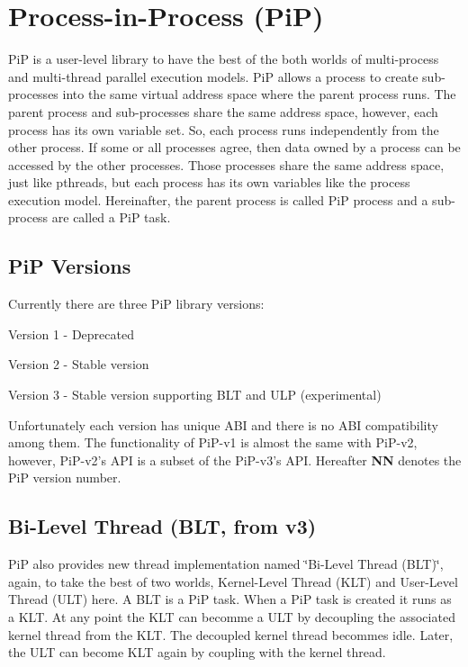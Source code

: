\section*{Process-\/in-\/\-Process (Pi\-P)}

Pi\-P is a user-\/level library to have the best of the both worlds of multi-\/process and multi-\/thread parallel execution models. Pi\-P allows a process to create sub-\/processes into the same virtual address space where the parent process runs. The parent process and sub-\/processes share the same address space, however, each process has its own variable set. So, each process runs independently from the other process. If some or all processes agree, then data owned by a process can be accessed by the other processes. Those processes share the same address space, just like pthreads, but each process has its own variables like the process execution model. Hereinafter, the parent process is called Pi\-P process and a sub-\/process are called a Pi\-P task.

\subsection*{Pi\-P Versions}

Currently there are three Pi\-P library versions\-:


\begin{DoxyItemize}
\item Version 1 -\/ Deprecated
\item Version 2 -\/ Stable version
\item Version 3 -\/ Stable version supporting B\-L\-T and U\-L\-P (experimental)
\end{DoxyItemize}

Unfortunately each version has unique A\-B\-I and there is no A\-B\-I compatibility among them. The functionality of Pi\-P-\/v1 is almost the same with Pi\-P-\/v2, however, Pi\-P-\/v2's A\-P\-I is a subset of the Pi\-P-\/v3's A\-P\-I. Hereafter {\bfseries N\-N} denotes the Pi\-P version number.

\subsection*{Bi-\/\-Level Thread (B\-L\-T, from v3)}

Pi\-P also provides new thread implementation named \char`\"{}\-Bi-\/\-Level Thread
(\-B\-L\-T)\char`\"{}, again, to take the best of two worlds, Kernel-\/\-Level Thread (K\-L\-T) and User-\/\-Level Thread (U\-L\-T) here. A B\-L\-T is a Pi\-P task. When a Pi\-P task is created it runs as a K\-L\-T. At any point the K\-L\-T can becomme a U\-L\-T by decoupling the associated kernel thread from the K\-L\-T. The decoupled kernel thread becommes idle. Later, the U\-L\-T can become K\-L\-T again by coupling with the kernel thread.

